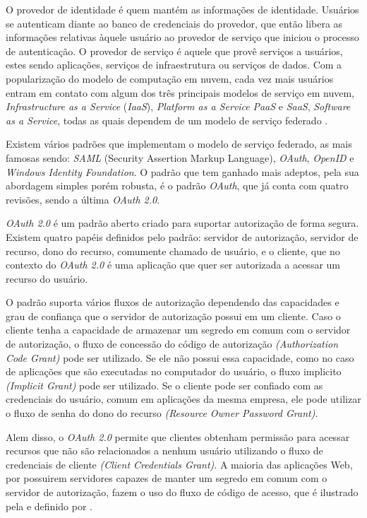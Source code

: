   O provedor de identidade é quem mantém as informações de identidade. Usuários 
  se autenticam diante ao banco de credenciais do provedor, que então libera as
  informações relativas àquele usuário ao provedor de serviço que iniciou o processo 
  de autenticação. O provedor de serviço é aquele que provê serviços a usuários, 
  estes sendo aplicações, serviços de infraestrutura ou serviços de dados. Com a popularização 
  do modelo de computação em nuvem, cada vez mais usuários entram em contato com algum dos três 
  principais modelos de serviço em nuvem,  \emph{Infrastructure as a Service} (\emph{IaaS}), 
  \emph{Platform as a Service} \emph{PaaS} e \emph{SaaS}, \emph{Software as a Service}, 
  todas as quais dependem de um modelo de serviço federado \cite{rountree2012federated}.

  Existem vários padrões que implementam o modelo de serviço federado, as mais famosas sendo:
  \emph{SAML} (Security Assertion Markup Language), \emph{OAuth}, \emph{OpenID} 
  e \emph{Windows Identity Foundation}. O 
  padrão que tem ganhado mais adeptos, pela sua abordagem simples porém robusta,
  é o padrão \emph{OAuth}, que já conta com quatro revisões, sendo a última
  \emph{OAuth 2.0}. 

  \emph{OAuth 2.0} é um padrão aberto criado para suportar autorização de forma segura. 
    Existem quatro papéis definidos pelo padrão: servidor de autorização, 
  servidor de recurso, dono do recurso, comumente chamado de usuário, e o cliente, 
  que no contexto do \emph{OAuth 2.0} é uma aplicação que quer ser autorizada a 
  acessar um recurso do usuário. 

  O padrão suporta vários fluxos de autorização dependendo das capacidades 
  e grau de confiança que o servidor de autorização possui em um cliente.
  Caso o cliente tenha a capacidade de armazenar um segredo em comum com o 
  servidor de autorização, o fluxo de concessão do código de autorização \emph{(Authorization Code Grant)} 
  pode ser utilizado. Se ele não possui essa capacidade, como no caso de aplicações 
  que são executadas no computador do usuário, o fluxo implicito \emph{(Implicit Grant)} 
  pode ser utilizado. Se o cliente pode ser confiado com as credenciais do usuário, 
  comum em aplicações da mesma empresa, 
  ele pode utilizar o fluxo de senha do dono do recurso \emph{(Resource Owner Password Grant)}.

  Alem disso, o \emph{OAuth 2.0} permite que clientes obtenham permissão para acessar 
  recursos que não são relacionados a nenhum usuário utilizando o fluxo de credenciais 
  de cliente \emph{(Client Credentials Grant)}. 
  A maioria das aplicações Web, por possuirem servidores capazes de manter 
  um segredo em comum com o servidor de autorização, fazem o uso do fluxo de código de acesso,
  que é ilustrado pela  e definido por . 

